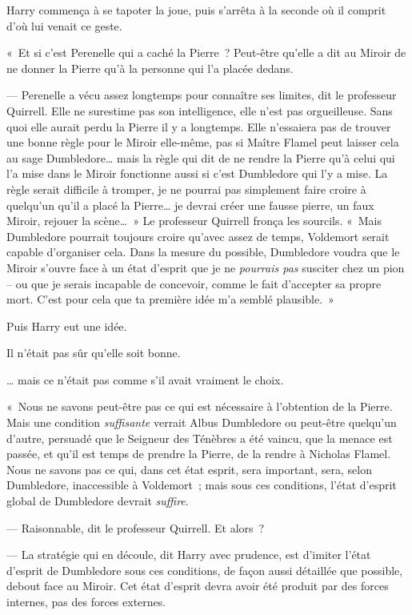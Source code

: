 Harry commença à se tapoter la joue, puis s'arrêta à la seconde où il comprit d'où lui venait ce geste.

«~Et si c'est Perenelle qui a caché la Pierre~? Peut-être qu'elle a dit au Miroir de ne donner la Pierre qu'à la personne qui l'a placée dedans.

--- Perenelle a vécu assez longtemps pour connaître ses limites, dit le professeur Quirrell. Elle ne surestime pas son intelligence, elle n'est pas orgueilleuse. Sans quoi elle aurait perdu la Pierre il y a longtemps. Elle n'essaiera pas de trouver une bonne règle pour le Miroir elle-même, pas si Maître Flamel peut laisser cela au sage Dumbledore… mais la règle qui dit de ne rendre la Pierre qu'à celui qui l'a mise dans le Miroir fonctionne aussi si c'est Dumbledore qui l'y a mise. La règle serait difficile à tromper, je ne pourrai pas simplement faire croire à quelqu'un qu'il a placé la Pierre… je devrai créer une fausse pierre, un faux Miroir, rejouer la scène…~» Le professeur Quirrell fronça les sourcils. «~Mais Dumbledore pourrait toujours croire qu'avec assez de temps, Voldemort serait capable d'organiser cela. Dans la mesure du possible, Dumbledore voudra que le Miroir s'ouvre face à un état d'esprit que je ne \emph{pourrais pas} susciter chez un pion -- ou que je serais incapable de concevoir, comme le fait d'accepter sa propre mort. C'est pour cela que ta première idée m'a semblé plausible.~»

Puis Harry eut une idée.

Il n'était pas sûr qu'elle soit bonne.

… mais ce n'était pas comme s'il avait vraiment le choix.

«~Nous ne savons peut-être pas ce qui est nécessaire à l'obtention de la Pierre. Mais une condition \emph{suffisante} verrait Albus Dumbledore ou peut-être quelqu'un d'autre, persuadé que le Seigneur des Ténèbres a été vaincu, que la menace est passée, et qu'il est temps de prendre la Pierre, de la rendre à Nicholas Flamel. Nous ne savons pas ce qui, dans cet état esprit, sera important, sera, selon Dumbledore, inaccessible à Voldemort~; mais sous ces conditions, l'état d'esprit global de Dumbledore devrait \emph{suffire}.

--- Raisonnable, dit le professeur Quirrell. Et alors~?

--- La stratégie qui en découle, dit Harry avec prudence, est d'imiter l'état d'esprit de Dumbledore sous ces conditions, de façon aussi détaillée que possible, debout face au Miroir. Cet état d'esprit devra avoir été produit par des forces internes, pas des forces externes.

